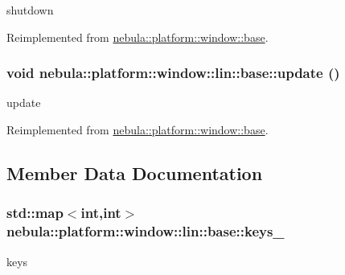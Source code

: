 shutdown 

Reimplemented from \hyperlink{classnebula_1_1platform_1_1window_1_1base_a656d35bf58a3c27a07117b68de3ff2f1}{nebula::platform::window::base}.\hypertarget{classnebula_1_1platform_1_1window_1_1lin_1_1base_ab3a910d3a1f8b6d37d57461e02071f3f}{
\subsubsection[{update}]{\setlength{\rightskip}{0pt plus 5cm}void nebula::platform::window::lin::base::update ()}}
\label{classnebula_1_1platform_1_1window_1_1lin_1_1base_ab3a910d3a1f8b6d37d57461e02071f3f}


update 

Reimplemented from \hyperlink{classnebula_1_1platform_1_1window_1_1base_aac6186e43bad0446f303ced7e3593a3a}{nebula::platform::window::base}.

\subsection{Member Data Documentation}
\hypertarget{classnebula_1_1platform_1_1window_1_1lin_1_1base_a2d1f7ebc4e8cdbab2553e0ae344af178}{
\subsubsection[{keys\_\-}]{\setlength{\rightskip}{0pt plus 5cm}std::map$<$int,int$>$ {\bf nebula::platform::window::lin::base::keys\_\-}}}
\label{classnebula_1_1platform_1_1window_1_1lin_1_1base_a2d1f7ebc4e8cdbab2553e0ae344af178}


keys 

